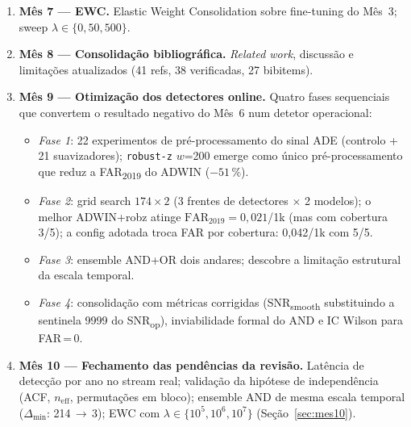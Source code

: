 \documentclass[11pt,a4paper]{article}
\begin{document}
\begin{enumerate}[leftmargin=2em,itemsep=2pt]
          (notebook 04, parte 3). Calibra\c{c}\~ao de ADWIN/PH por ARL
          sint\'etico (resultado negativo documentado); curva de
          lat\^encia com baseline i.i.d.\ e shifts em $\sigma$;
          valida\c{c}\~ao do Pelt por BOCPD e sensibilidade ao gamma.
    \item \textbf{M\^es 7 --- EWC.} Elastic Weight Consolidation sobre
          fine-tuning do M\^es~3; sweep $\lambda \in \{0, 50, 500\}$.
    \item \textbf{M\^es 8 --- Consolida\c{c}\~ao bibliogr\'afica.}
          \emph{Related work}, discuss\~ao e limita\c{c}\~oes
          atualizados (41 refs, 38 verificadas, 27 bibitems).
    \item \textbf{M\^es 9 --- Otimiza\c{c}\~ao dos detectores online.}
          Quatro fases sequenciais que convertem o resultado negativo do
          M\^es~6 num detetor operacional:
          \begin{itemize}[leftmargin=1.4em,itemsep=2pt]
              \item \emph{Fase 1}: 22 experimentos de pr\'e-processamento
                    do sinal ADE (controlo + 21 suavizadores);
                    \texttt{robust-z} $w$=200 emerge como \'unico
                    pr\'e-processamento que reduz a FAR\textsubscript{2019}
                    do ADWIN ($-51\,\%$).
              \item \emph{Fase 2}: grid search $174 \times 2$ (3 frentes
                    de detectores $\times$ 2 modelos); o melhor ADWIN+robz
                    atinge $\text{FAR}_{2019}\!=\!0{,}021$/1k (mas com
                    cobertura 3/5); a config adotada troca FAR por
                    cobertura: 0{,}042/1k com 5/5.
              \item \emph{Fase 3}: ensemble AND+OR dois andares; descobre
                    a limita\c{c}\~ao estrutural da escala temporal.
              \item \emph{Fase 4}: consolida\c{c}\~ao com m\'etricas
                    corrigidas (SNR\textsubscript{smooth} substituindo a
                    sentinela 9999 do SNR\textsubscript{op}),
                    inviabilidade formal do AND e IC Wilson para
                    FAR\,=\,0.
          \end{itemize}
    \item \textbf{M\^es 10 --- Fechamento das pend\^encias da revis\~ao.}
          Lat\^encia de detec\c{c}\~ao por ano no stream real;
          valida\c{c}\~ao da hip\'otese de independ\^encia (ACF,
          $n_\text{eff}$, permuta\c{c}\~oes em bloco); ensemble AND de
          mesma escala temporal ($\Delta_{\min}$: 214\,$\to$\,3);
          EWC com $\lambda\!\in\!\{10^5, 10^6, 10^7\}$
          (Se\c{c}\~ao~\ref{sec:mes10}).
\end{enumerate}
\end{document}
